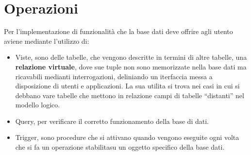 \chapter{Operazioni}
Per l'implementazione di funzionalità che la base dati deve offrire agli utento aviene mediante l'utilizzo di:
\begin{itemize}
\item Viste, sono delle tabelle, che vengono descritte in termini di altre tabelle, una \textbf{relazione virtuale}, dove sue tuple non sono memorizzate nella base dati ma ricavabili medianti interrogazioni, deliniando un iterfaccia messa a disposizione di utenti e applicazioni. La sua utilita si trova nei casi in cui si debbano vare tabelle che mettono in relazione campi di tabelle “distanti” nel modello logico.
\item Query, per verificare il corretto funzionamento della base di dati.
\item Trigger, sono procedure che si attivano quando vengono eseguite ogni volta che si fa un operazione stabilitasu un oggetto specifico della base dati.
\end{itemize}




